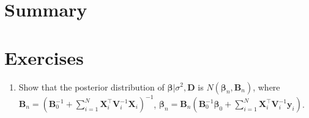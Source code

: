 \section{Summary}\label{sec94}

\section{Exercises}\label{sec95}

\begin{enumerate}
	
	\item Show that the posterior distribution of $\bm{\beta}|\sigma^2,\bm{D}$ is $N(\bm{\beta}_n,\bm{B}_n)$, where $\bm{B}_n = (\bm{B}_0^{-1} +\sum_{i=1}^N \bm{X}_i^{\top}\bm{V}_i^{-1}\bm{X}_i)^{-1}$, $\bm{\beta}_n= \bm{B}_n(\bm{B}_0^{-1}\bm{\beta}_0 + \sum_{i=1}^N\bm{X}_i^{\top}\bm{V}_i^{-1}\bm{y}_i)$.
	
\end{enumerate}